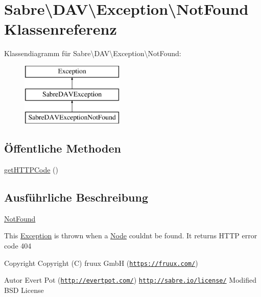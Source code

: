 \hypertarget{class_sabre_1_1_d_a_v_1_1_exception_1_1_not_found}{}\section{Sabre\textbackslash{}D\+AV\textbackslash{}Exception\textbackslash{}Not\+Found Klassenreferenz}
\label{class_sabre_1_1_d_a_v_1_1_exception_1_1_not_found}
Klassendiagramm für Sabre\textbackslash{}D\+AV\textbackslash{}Exception\textbackslash{}Not\+Found\+:\begin{figure}[H]
\begin{center}
\leavevmode
\includegraphics[height=3.000000cm]{class_sabre_1_1_d_a_v_1_1_exception_1_1_not_found}
\end{center}
\end{figure}
\subsection*{Öffentliche Methoden}
\begin{DoxyCompactItemize}
\item 
\mbox{\hyperlink{class_sabre_1_1_d_a_v_1_1_exception_1_1_not_found_add9571541b5568437b300275c5ec2ea4}{get\+H\+T\+T\+P\+Code}} ()
\end{DoxyCompactItemize}


\subsection{Ausführliche Beschreibung}
\mbox{\hyperlink{class_sabre_1_1_d_a_v_1_1_exception_1_1_not_found}{Not\+Found}}

This \mbox{\hyperlink{class_sabre_1_1_d_a_v_1_1_exception}{Exception}} is thrown when a \mbox{\hyperlink{class_sabre_1_1_d_a_v_1_1_node}{Node}} couldn\textquotesingle{}t be found. It returns H\+T\+TP error code 404

\begin{DoxyCopyright}{Copyright}
Copyright (C) fruux GmbH (\href{https://fruux.com/}{\tt https\+://fruux.\+com/}) 
\end{DoxyCopyright}
\begin{DoxyAuthor}{Autor}
Evert Pot (\href{http://evertpot.com/}{\tt http\+://evertpot.\+com/})  \href{http://sabre.io/license/}{\tt http\+://sabre.\+io/license/} Modified B\+SD License 
\end{DoxyAuthor}


